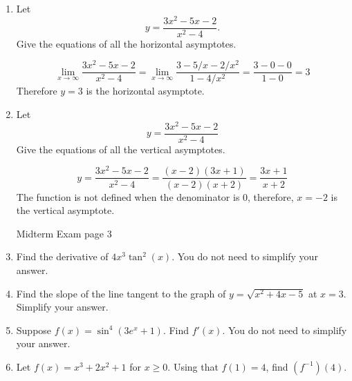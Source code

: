 \documentclass[12pt]{article}
\begin{document}
\begin{enumerate}
\bigskip

\item Let
\[
y = \frac{3x^2 - 5x - 2}{x^2 - 4}.
\]
Give the equations of all the horizontal asymptotes.

\medskip
{}
\[
\lim_{x\rightarrow \infty} \frac{3x^2 - 5x - 2}{x^2 - 4} =
\lim_{x\rightarrow \infty} \frac{3 - 5/x - 2/x^2}{1 - 4/x^2} =
\frac{3-0-0}{1-0}
=3
\]
Therefore $y = 3$ is the horizontal asymptote.

\bigskip

\item Let
\[
y = \frac{3x^2 - 5x - 2}{x^2 - 4}
\]
Give the equations of all the vertical asymptotes.

\medskip
{}
\[
y = \frac{3x^2 - 5x - 2}{x^2 - 4} = \frac{(x-2)(3x+1)}{(x-2)(x+2)}
=\frac{3x+1}{x+2}
\]
The function is not defined when the denominator is 0, therefore, $x = -2$ is
the vertical asymptote. 
\bigskip

\newpage

\noindent Midterm Exam \hfill page 3

\item Find the derivative of $4x^3 \tan^2(x)$. 
You do not need to simplify your answer.

\medskip
{}
\bigskip

\item Find the slope of the line tangent to the graph of 
$y = \sqrt{x^2 + 4x - 5}$ at $x = 3$. Simplify your answer.

\medskip
{}
\bigskip

\item Suppose $f(x) = \sin^4(3e^x + 1)$. Find $f'(x)$. 
You do not need to simplify your answer.

\medskip
{}
\bigskip

\item Let $f(x) = x^3 + 2x^2 + 1$ for $x \geq 0$. 
Using that $f(1) = 4$, find $(f^{-1})(4)$.

\medskip
{}
\bigskip

\end{enumerate}
\end{document}
